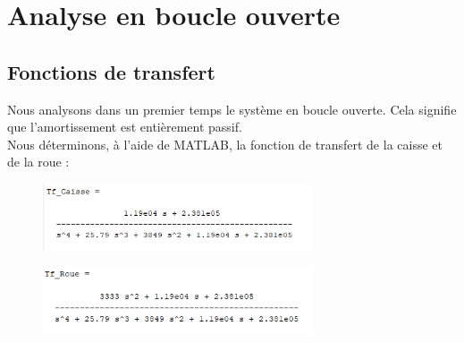 \documentclass[a4paper,12pt]{insa} %
\begin{document}
\section{Analyse en boucle ouverte}
\subsection{Fonctions de transfert}
Nous analysons dans un premier temps le système en boucle ouverte. Cela signifie que l'amortissement est entièrement passif.\\
Nous déterminons, à l'aide de MATLAB, la fonction de transfert de la caisse et de la roue : \\
\begin{center}
    \begin{figure}[H]
        \centering
        \includegraphics[width=8cm, keepaspectratio]{figures/tf_caisse.png}
    \end{figure}
\end{center}
\begin{center}
    \begin{figure}[H]
        \centering
        \includegraphics[width=8cm, keepaspectratio]{figures/tf_roue.png}
    \end{figure}
\end{center}
\end{document}
